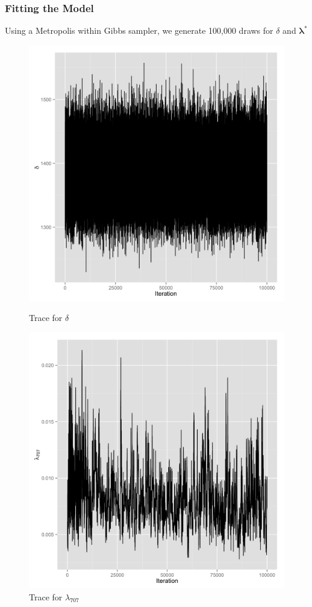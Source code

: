 \documentclass[10pt, compress]{beamer}
\begin{document}
  \begin{frame}
    \frametitle{Fitting the Model}
    Using a Metropolis within Gibbs sampler, we generate 100,000 draws for $\delta$ and $\boldsymbol\lambda^{*}$
    \begin{figure}
      \begin{minipage}{0.45\textwidth}
        \includegraphics[width=1.0\textwidth]{delta_trace.png}
        \caption{Trace for $\delta$}
      \end{minipage}
      \hfill
      \begin{minipage}{0.45\textwidth}
        \includegraphics[width=1.0\textwidth]{lambda_trace.png}
        \caption{Trace for $\lambda_{707}$}
      \end{minipage}
    \end{figure}
  \end{frame}
\end{document}
